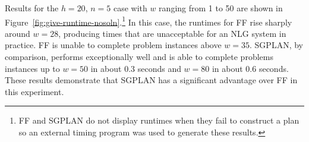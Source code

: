 Results for the $h=20$, $n=5$ case with $w$ ranging from 1 to 50 are shown
in Figure~\ref{fig:give-runtime-nosoln}.\footnote{FF and SGPLAN do
 not display runtimes when they fail to construct a plan so an external timing
 program was used to generate these results.}
In this case, the runtimes for FF rise sharply around $w=28$, producing
times that are unacceptable for an NLG system in practice. FF is unable
to complete problem instances above $w=35$. SGPLAN, by comparison, performs
exceptionally well and is able to complete problems instances up to $w=50$
in about 0.3 seconds and $w=80$ in about 0.6 seconds. These results
demonstrate that SGPLAN has a significant advantage over FF in this
experiment. 




